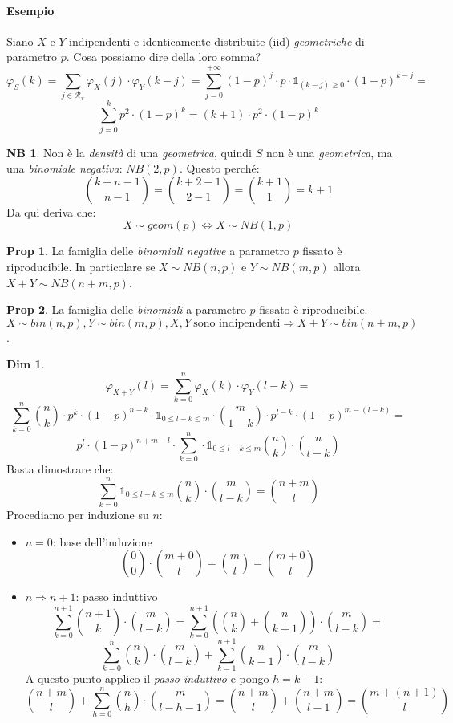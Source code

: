 \documentclass[12pt, a4paper]{report}
\theoremstyle{definition}
\newtheorem*{demonstration}{Dim}
\newtheorem*{proposition}{Prop}
\newtheorem*{note}{NB}
\DeclareRobustCommand{\supp}{\mathcal{R}}%
\DeclareRobustCommand{\one}{\mathds{1}}
\begin{document}
\paragraph*{Esempio}
Siano $X$ e $Y$ indipendenti e identicamente distribuite (iid) \emph{geometriche}
di parametro $p$. Cosa possiamo dire della loro somma?
\[\varphi_S(k)=\sum_{j\in\supp_x}\varphi_X(j)\cdot \varphi_Y(k-j)=\sum_{j=0}^{+\infty}
(1-p)^j\cdot p\cdot \one_{(k-j)\geq 0}\cdot (1-p)^{k-j}=\]
\[\sum_{j=0}^kp^2\cdot (1-p)^k=(k+1)\cdot p^2\cdot (1-p)^k\]

\begin{note}
	Non è la \emph{densità} di una \emph{geometrica}, quindi $S$ non è una \emph
	{geometrica}, ma una \emph{binomiale negativa}: \(NB(2,p)\). Questo perché:
	\[\binom{k+n-1}{n-1}=\binom{k+2-1}{2-1}=\binom{k+1}{1}=k+1\]
	Da qui deriva che:
	\[X\sim geom(p)\Leftrightarrow X\sim NB(1,p)\]
\end{note}

\begin{proposition}
	La famiglia delle \emph{binomiali negative} a parametro $p$ fissato è
	riproducibile. In particolare se \(X\sim NB(n,p)\) e \(Y\sim NB(m,p)\) allora
	\(X+Y\sim NB(n+m,p)\).
\end{proposition}

\begin{proposition}
	La famiglia delle \emph{binomiali} a parametro $p$ fissato è riproducibile.
	\(X\sim bin(n,p),Y\sim bin(m,p), X,Y\ \text{sono indipendenti}\Rightarrow
	X+Y\sim bin(n+m,p)\).
\end{proposition}
\begin{demonstration}
	\[\varphi_{X+Y}(l)=\sum_{k=0}^n\varphi_X(k)\cdot \varphi_Y(l-k)=\]
	\[\sum_{k=0}^n\binom{n}{k}\cdot p^k\cdot (1-p)^{n-k}\cdot \one_{0\leq l-k\leq m}\cdot \binom{m}
	{1-k}\cdot p^{l-k}\cdot (1-p)^{m-(l-k)}=\]
	\[p^l\cdot (1-p)^{n+m-l}\cdot \sum_{k=0}^n\cdot \one_{0\leq l-k\leq m}\binom{n}{k}\cdot \binom{n}{l-k}\]
	Basta dimostrare che:
	\[\sum_{k=0}^n\one_{0\leq l-k\leq m}\binom{n}{k}\cdot \binom{m}{l-k}=\binom{n+m}{l}\]
	Procediamo per induzione su $n$:
	\begin{itemize}
		\item $n=0$: base dell'induzione
		\[\binom{0}{0}\cdot \binom{m+0}{l}=\binom{m}{l}=\binom{m+0}{l}\]
		\item $n\Rightarrow n+1$: passo induttivo
		\[\sum_{k=0}^{n+1}\binom{n+1}{k}\cdot \binom{m}{l-k}=\sum_{k=0}^{n+1}\left(
		\binom{n}{k}+\binom{n}{k+1}\right)\cdot \binom{m}{l-k}=\]
		\[\sum_{k=0}^n\binom{n}{k}\cdot \binom{m}{l-k}+\sum_{k=1}^{n+1}\binom{n}{k-1}
		\cdot \binom{m}{l-k}\]
		A questo punto applico il \emph{passo induttivo} e pongo $h=k-1$:
		\[\binom{n+m}{l}+\sum_{h=0}^n\binom{n}{h}\cdot \binom{m}{l-h-1}=\binom{n+m}{l}
		+\binom{n+m}{l-1}=\binom{m+(n+1)}{l}\]
	\end{itemize}
\end{demonstration}
\end{document}

